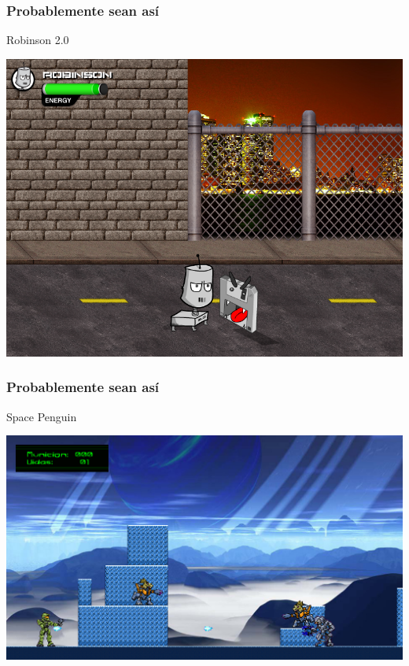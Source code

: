 \begin{frame}
	\frametitle{Probablemente sean así}

	\begin{center}
	Robinson 2.0
	
	    \includegraphics[scale=0.3]{img/robinson.png}
	\end{center}
\end{frame}

\begin{frame}
	\frametitle{Probablemente sean así}

	\begin{center}
	Space Penguin
	
	    \includegraphics[scale=0.3]{img/spacepenguin.png}
	\end{center}
\end{frame}

